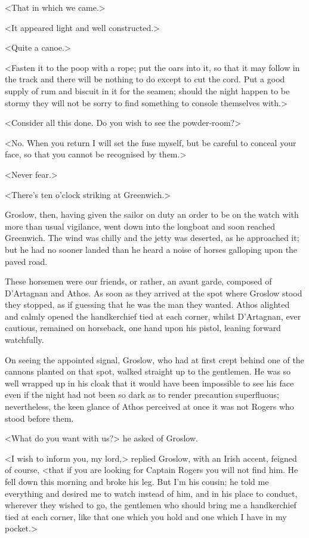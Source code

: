 <That in which we came.>

<It appeared light and well constructed.>

<Quite a canoe.>

<Fasten it to the poop with a rope; put the oars into it, so that it may follow in the track and there will be nothing to do except to cut the cord. Put a good supply of rum and biscuit in it for the seamen; should the night happen to be stormy they will not be sorry to find something to console themselves with.>

<Consider all this done. Do you wish to see the powder-room?>

<No. When you return I will set the fuse myself, but be careful to conceal your face, so that you cannot be recognised by them.>

<Never fear.>

<There's ten o'clock striking at Greenwich.>

Groslow, then, having given the sailor on duty an order to be on the watch with more than usual vigilance, went down into the longboat and soon reached Greenwich. The wind was chilly and the jetty was deserted, as he approached it; but he had no sooner landed than he heard a noise of horses galloping upon the paved road.

These horsemen were our friends, or rather, an avant garde, composed of D'Artagnan and Athos. As soon as they arrived at the spot where Groslow stood they stopped, as if guessing that he was the man they wanted. Athos alighted and calmly opened the handkerchief tied at each corner, whilst D'Artagnan, ever cautious, remained on horseback, one hand upon his pistol, leaning forward watchfully.

On seeing the appointed signal, Groslow, who had at first crept behind one of the cannons planted on that spot, walked straight up to the gentlemen. He was so well wrapped up in his cloak that it would have been impossible to see his face even if the night had not been so dark as to render precaution superfluous; nevertheless, the keen glance of Athos perceived at once it was not Rogers who stood before them.

<What do you want with us?> he asked of Groslow.

<I wish to inform you, my lord,> replied Groslow, with an Irish accent, feigned of course, <that if you are looking for Captain Rogers you will not find him. He fell down this morning and broke his leg. But I'm his cousin; he told me everything and desired me to watch instead of him, and in his place to conduct, wherever they wished to go, the gentlemen who should bring me a handkerchief tied at each corner, like that one which you hold and one which I have in my pocket.>

